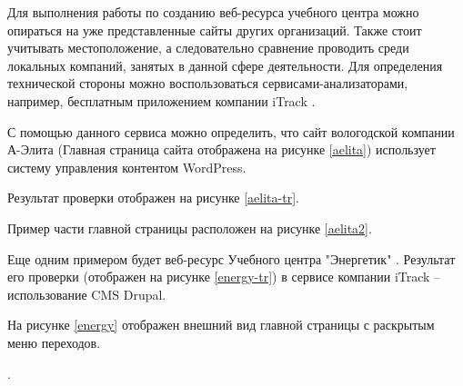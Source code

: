Для выполнения работы по созданию веб-ресурса учебного центра можно опираться на уже представленные сайты других организаций.
Также стоит учитывать местоположение, а следовательно сравнение проводить среди локальных компаний, занятых в данной сфере деятельности.
Для определения технической стороны можно воспользоваться сервисами-анализаторами, например, бесплатным приложением компании iTrack \cite{iTrack}.

С помощью данного сервиса можно определить, что сайт вологодской компании А-Элита \cite{aelita} (Главная страница сайта отображена на рисунке \ref{aelita}) использует систему управления контентом WordPress.


Результат проверки отображен на рисунке \ref{aelita-tr}.


Пример части главной страницы расположен на рисунке \ref{aelita2}.


Еще одним примером будет веб-ресурс Учебного центра "Энергетик" \cite{energy}.
Результат его проверки (отображен на рисунке \ref{energy-tr}) в сервисе компании iTrack -- использование CMS Drupal.


На рисунке \ref{energy} отображен внешний вид главной страницы с раскрытым меню переходов.

.


\clearpage
